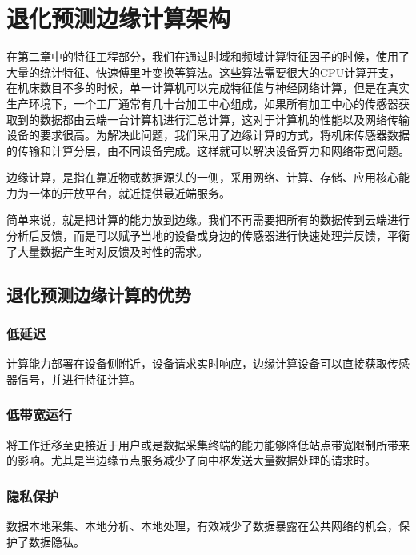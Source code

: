 \chapter{退化预测边缘计算架构}
在第二章中的特征工程部分，我们在通过时域和频域计算特征因子的时候，使用了大量的统计特征、快速傅里叶变换等算法。这些算法需要很大的CPU计算开支，在机床数目不多的时候，单一计算机可以完成特征值与神经网络计算，但是在真实生产环境下，一个工厂通常有几十台加工中心组成，如果所有加工中心的传感器获取到的数据都由云端一台计算机进行汇总计算，这对于计算机的性能以及网络传输设备的要求很高。为解决此问题，我们采用了边缘计算的方式，将机床传感器数据的传输和计算分层，由不同设备完成。这样就可以解决设备算力和网络带宽问题。
 \par
边缘计算，是指在靠近物或数据源头的一侧，采用网络、计算、存储、应用核心能力为一体的开放平台，就近提供最近端服务。\par
简单来说，就是把计算的能力放到边缘。我们不再需要把所有的数据传到云端进行分析后反馈，而是可以赋予当地的设备或身边的传感器进行快速处理并反馈，平衡了大量数据产生时对反馈及时性的需求。\par
% 
\section{退化预测边缘计算的优势}
\subsection{低延迟}
计算能力部署在设备侧附近，设备请求实时响应，边缘计算设备可以直接获取传感器信号，并进行特征计算。
\subsection{低带宽运行}
将工作迁移至更接近于用户或是数据采集终端的能力能够降低站点带宽限制所带来的影响。尤其是当边缘节点服务减少了向中枢发送大量数据处理的请求时。
\subsection{隐私保护}
数据本地采集、本地分析、本地处理，有效减少了数据暴露在公共网络的机会，保护了数据隐私。
